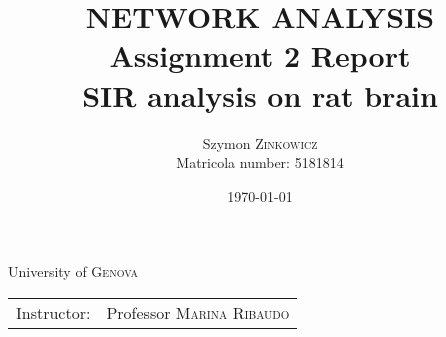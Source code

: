 \documentclass[
	report, %
	11pt, %
]{CSUniSchoolLabReport}
\newcounter{ct}
\begin{document}
\title{NETWORK ANALYSIS \\
\large Assignment 2 Report \\
		SIR analysis on rat brain} %
\author{Szymon \textsc{Zinkowicz} \\ Matricola number: 5181814} %
\date{\today} %

\maketitle %
\thispagestyle{empty}

\begin{center}
	\vspace{\fill}
	University of \textsc{Genova} \\
	\begin{tabular}{l r}
		Instructor: & Professor \textsc{Marina Ribaudo}
	\end{tabular}
\end{center}
\pagebreak
\end{document}

